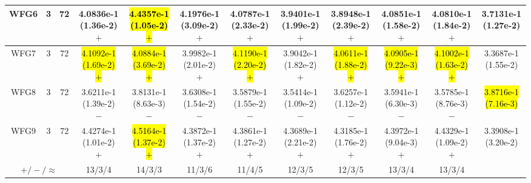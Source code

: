 \documentclass[journal]{IEEEtran}
\begin{document}
\begin{table*}[htbp]
\begin{tabular}{cccccccccccc}
\hline
\multirow{1}{*}{WFG6}&3&72&4.0836e-1 (1.36e-2) $+$&\hl{4.4357e-1 (1.05e-2) $+$}&4.1976e-1 (3.09e-2) $+$&4.0787e-1 (2.33e-2) $+$&3.9401e-1 (1.99e-2) $+$&3.8948e-1 (2.39e-2) $+$&4.0851e-1 (1.58e-2) $+$&4.0810e-1 (1.84e-2) $+$&3.7131e-1 (1.27e-2)\\
\hline
\multirow{1}{*}{WFG7}&3&72&\hl{4.1092e-1 (1.69e-2) $+$}&\hl{4.0884e-1 (3.69e-2) $+$}&3.9982e-1 (2.01e-2) $+$&\hl{4.1190e-1 (2.20e-2) $+$}&3.9042e-1 (1.82e-2) $+$&\hl{4.0611e-1 (1.88e-2) $+$}&\hl{4.0905e-1 (9.22e-3) $+$}&\hl{4.1002e-1 (1.63e-2) $+$}&3.3687e-1 (1.55e-2)\\
\hline
\multirow{1}{*}{WFG8}&3&72&3.6211e-1 (1.39e-2) $-$&3.8131e-1 (8.63e-3) $-$&3.6308e-1 (1.54e-2) $-$&3.5879e-1 (1.55e-2) $-$&3.5414e-1 (1.09e-2) $-$&3.6257e-1 (1.12e-2) $-$&3.5941e-1 (6.30e-3) $-$&3.5785e-1 (8.76e-3) $-$&\hl{3.8716e-1 (7.16e-3)}\\
\hline
\multirow{1}{*}{WFG9}&3&72&4.4274e-1 (1.01e-2) $+$&\hl{4.5164e-1 (1.37e-2) $+$}&4.3872e-1 (1.37e-2) $+$&4.3861e-1 (1.27e-2) $+$&4.3689e-1 (2.21e-2) $+$&4.3185e-1 (1.76e-2) $+$&4.3972e-1 (9.04e-3) $+$&4.4329e-1 (1.09e-2) $+$&3.3908e-1 (3.20e-2)\\
\hline
\multicolumn{3}{c}{$+/-/\approx$}&13/3/4&14/3/3&11/3/6&11/4/5&12/3/5&12/3/5&13/3/4&13/3/4&\\
\bottomrule
\end{tabular}
\label{No Label}
\end{table*}
\end{document}
